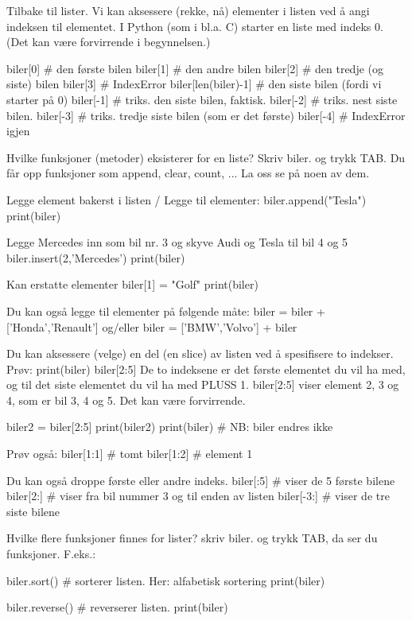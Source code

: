 {Tilbake til lister. 
Vi kan aksessere (rekke, nå) elementer i listen ved å angi indeksen til elementet. 
I Python (som i bl.a. C) starter en liste med indeks 0.
(Det kan være forvirrende i begynnelsen.) 

biler[0]       # den første bilen 
biler[1]       # den andre bilen
biler[2]       # den tredje (og siste) bilen
biler[3]       # IndexError
biler[len(biler)-1]   # den siste bilen (fordi vi starter på 0) 
biler[-1]      # triks. den siste bilen, faktisk. 
biler[-2]      # triks. nest siste bilen. 
biler[-3]      # triks. tredje siste bilen (som er det første)
biler[-4]      # IndexError igjen


Hvilke funksjoner (metoder) eksisterer for en liste?
Skriv biler. og trykk TAB. 
Du får opp funksjoner som append, clear, count, ... 
La oss se på noen av dem. 


Legge element bakerst i listen / Legge til elementer: 
biler.append("Tesla")
print(biler)

Legge Mercedes inn som bil nr. 3 og skyve Audi og Tesla til bil 4 og 5 
biler.insert(2,'Mercedes')
print(biler)

Kan erstatte elementer
biler[1] = "Golf"
print(biler)

Du kan også legge til elementer på følgende måte:
biler = biler + ['Honda','Renault']
og/eller 
biler = ['BMW','Volvo'] + biler


Du kan aksessere (velge) en del (en slice) av listen ved å spesifisere to indekser.
Prøv: 
print(biler)
biler[2:5]
De to indeksene er det første elementet du vil ha med,
og til det siste elementet du vil ha med PLUSS 1. 
biler[2:5] viser element 2, 3 og 4, som er bil 3, 4 og 5. 
Det kan være forvirrende. 

biler2 = biler[2:5] 
print(biler2)
print(biler)          # NB: biler endres ikke 

Prøv også: 
biler[1:1]   # tomt
biler[1:2]   # element 1


Du kan også droppe første eller andre indeks.
biler[:5]     # viser de 5 første bilene
biler[2:]     # viser fra bil nummer 3 og til enden av listen
biler[-3:]    # viser de tre siste bilene


Hvilke flere funksjoner finnes for lister?
skriv biler. og trykk TAB, da ser du funksjoner. 
F.eks.:

biler.sort()          # sorterer listen. Her: alfabetisk sortering
print(biler)

biler.reverse()       # reverserer listen. 
print(biler)

}
